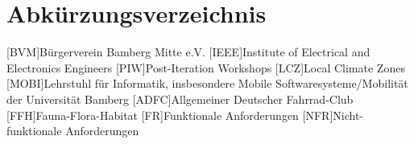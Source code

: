 \chapter*{Abkürzungsverzeichnis}

\begin{acronym}
    [BVM]{Bürgerverein Bamberg Mitte e.V.}
    [IEEE]{Institute of Electrical and Electronics Engineers}
    [PIW]{Post-Iteration Workshops}
    [LCZ]{Local Climate Zones}
    [MOBI]{Lehrstuhl für Informatik, insbesondere Mobile Softwaresysteme/Mobilität der Universität Bamberg}
    [ADFC]{Allgemeiner Deutscher Fahrrad-Club}
    [FFH]{Fauna-Flora-Habitat}
    [FR]{Funktionale Anforderungen}
    [NFR]{Nicht-funktionale Anforderungen}
\end{acronym}